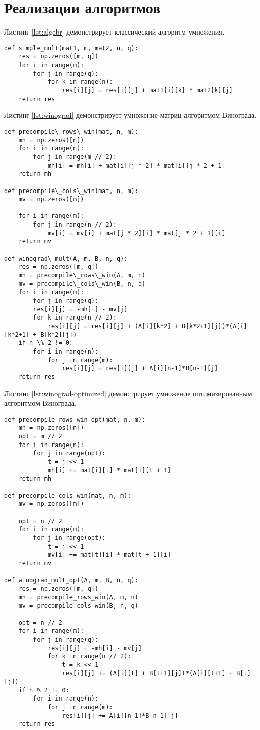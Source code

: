 \section{Реализации алгоритмов}
Листинг \ref{lst:algebr} демонстрирует классический алгоритм умножения. 


\captionsetup{singlelinecheck = false, justification=raggedright}
\begin{lstlisting}[label=lst:algebr,caption=Классический алгоритм умножения]
def simple_mult(mat1, m, mat2, n, q):
	res = np.zeros([m, q])
	for i in range(m):
		for j in range(q):
			for k in range(n):
				res[i][j] = res[i][j] + mat1[i][k] * mat2[k][j]
	return res
\end{lstlisting}

\newpage
Листинг \ref{lst:winograd} демонстрирует умножение матриц алгоритмом Винограда.

\begin{lstlisting}[label=lst:winograd,caption=Алгоритм умнложения Виноградом]
def precompile\_rows\_win(mat, n, m):
	mh = np.zeros([n])
	for i in range(n):
		for j in range(m // 2):
			mh[i] = mh[i] + mat[i][j * 2] * mat[i][j * 2 + 1]
	return mh

def precompile\_cols\_win(mat, n, m):
	mv = np.zeros([m])
	
	for i in range(m):
		for j in range(n // 2):
			mv[i] = mv[i] + mat[j * 2][i] * mat[j * 2 + 1][i]
	return mv

def winograd\_mult(A, m, B, n, q):
	res = np.zeros([m, q])
	mh = precompile\_rows\_win(A, m, n)
	mv = precompile\_cols\_win(B, n, q)
	for i in range(m):
		for j in range(q):
		res[i][j] = -mh[i] - mv[j]
		for k in range(n // 2):
			res[i][j] = res[i][j] + (A[i][k*2] + B[k*2+1][j])*(A[i][k*2+1] + B[k*2][j])
	if n \% 2 != 0:
		for i in range(n):
			for j in range(m):
				res[i][j] = res[i][j] + A[i][n-1]*B[n-1][j]
	return res

\end{lstlisting}	

\newpage
Листинг \ref{lst:winograd-optimized} демонстрирует умножение оптимизированным алгоритмом Винограда.
\begin{lstlisting}[label=lst:winograd-optimized,caption=Оптимизированный алгоритм умножения Виноградом]
def precompile_rows_win_opt(mat, n, m):
	mh = np.zeros([n])
	opt = m // 2
	for i in range(n):
		for j in range(opt):
			t = j << 1
			mh[i] += mat[i][t] * mat[i][t + 1]
	return mh

def precompile_cols_win(mat, n, m):
	mv = np.zeros([m])
	
	opt = n // 2
	for i in range(m):
		for j in range(opt):
			t = j << 1
			mv[i] += mat[t][i] * mat[t + 1][i]
	return mv

def winograd_mult_opt(A, m, B, n, q):
	res = np.zeros([m, q])
	mh = precompile_rows_win(A, m, n)
	mv = precompile_cols_win(B, n, q)
	
	opt = n // 2
	for i in range(m):
		for j in range(q):
			res[i][j] = -mh[i] - mv[j]
			for k in range(n // 2):
				t = k << 1
				res[i][j] += (A[i][t] + B[t+1][j])*(A[i][t+1] + B[t][j])
	if n % 2 != 0:
		for i in range(n):
			for j in range(m):
				res[i][j] += A[i][n-1]*B[n-1][j]
	return res
\end{lstlisting}


